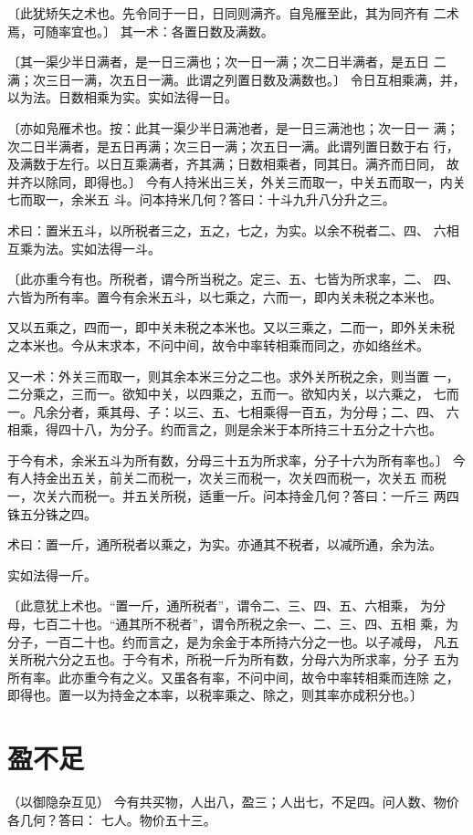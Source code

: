 \documentclass[12pt,UTF8]{ctexbook}
\begin{document}
〔此犹矫矢之术也。先令同于一日，日同则满齐。自凫雁至此，其为同齐有 二术焉，可随率宜也。〕 其一术：各置日数及满数。

〔其一渠少半日满者，是一日三满也；次一日一满；次二日半满者，是五日 二满；次三日一满，次五日一满。此谓之列置日数及满数也。〕 令日互相乘满，并，以为法。日数相乘为实。实如法得一日。

〔亦如凫雁术也。按：此其一渠少半日满池者，是一日三满池也；次一日一 满；次二日半满者，是五日再满；次三日一满；次五日一满。此谓列置日数于右 行，及满数于左行。以日互乘满者，齐其满；日数相乘者，同其日。满齐而日同， 故并齐以除同，即得也。〕 今有人持米出三关，外关三而取一，中关五而取一，内关七而取一，余米五 斗。问本持米几何？答曰：十斗九升八分升之三。

术曰：置米五斗，以所税者三之，五之，七之，为实。以余不税者二、四、 六相互乘为法。实如法得一斗。

〔此亦重今有也。所税者，谓今所当税之。定三、五、七皆为所求率，二、 四、六皆为所有率。置今有余米五斗，以七乘之，六而一，即内关未税之本米也。

又以五乘之，四而一，即中关未税之本米也。又以三乘之，二而一，即外关未税 之本米也。今从末求本，不问中间，故令中率转相乘而同之，亦如络丝术。

又一术：外关三而取一，则其余本米三分之二也。求外关所税之余，则当置 一，二分乘之，三而一。欲知中关，以四乘之，五而一。欲知内关，以六乘之， 七而一。凡余分者，乘其母、子：以三、五、七相乘得一百五，为分母；二、四、 六相乘，得四十八，为分子。约而言之，则是余米于本所持三十五分之十六也。

于今有术，余米五斗为所有数，分母三十五为所求率，分子十六为所有率也。〕 今有人持金出五关，前关二而税一，次关三而税一，次关四而税一，次关五 而税一，次关六而税一。并五关所税，适重一斤。问本持金几何？答曰：一斤三 两四铢五分铢之四。

术曰：置一斤，通所税者以乘之，为实。亦通其不税者，以减所通，余为法。

实如法得一斤。

〔此意犹上术也。“置一斤，通所税者”，谓令二、三、四、五、六相乘， 为分母，七百二十也。“通其所不税者”，谓令所税之余一、二、三、四、五相 乘，为分子，一百二十也。约而言之，是为余金于本所持六分之一也。以子减母， 凡五关所税六分之五也。于今有术，所税一斤为所有数，分母六为所求率，分子 五为所有率。此亦重今有之义。又虽各有率，不问中间，故令中率转相乘而连除 之，即得也。置一以为持金之本率，以税率乘之、除之，则其率亦成积分也。〕 

\chapter{盈不足}
（以御隐杂互见） 今有共买物，人出八，盈三；人出七，不足四。问人数、物价各几何？答曰： 七人。物价五十三。
\end{document}
